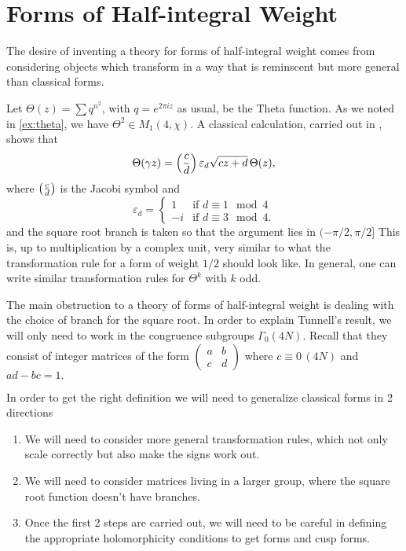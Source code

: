 \documentclass[12pt, a4paper]{report}
\begin{document}
\section{Forms of Half-integral Weight}

The desire of inventing a theory for forms of half-integral weight comes from
considering objects which transform in a way that is reminscent but more general
than classical forms.

\begin{example}
  Let $\Theta(z) = \sum q^{n^2}$, with $q = e^{2 \pi i z}$ as usual, be the
  Theta function.
  As we noted in
  \ref{ex:theta}, we have $\Theta^2 \in M_1(4,\chi)$. A classical calculation,
  carried out in \cite[Chapter III-4, Pages 148-149]{koblitz}, shows that
  \[\Theta(\gamma z) = \left(\frac{c}{d}\right) \varepsilon_d \sqrt{cz+d} \,  \Theta(z),\]
  where $\left(\frac{c}{d}\right)$ is the Jacobi symbol and
  \[\varepsilon_d =
    \begin{cases}
      1 & \text{if } d \equiv 1 \mod{4} \\ 
      -i & \text{if } d \equiv 3 \mod{4}.
    \end{cases}
  \]
  and the square root branch is taken so that the argument lies in $(-\pi/2,
  \pi/2 ]$
  This is, up to multiplication by a complex unit, very similar to what the
  transformation rule for a form of weight $1/2$ should look like.
  In general, one can write similar
  transformation rules for $\Theta^k$ with $k$ odd. 
\end{example}

The main obstruction to a theory of forms of half-integral weight is dealing
with the choice of branch for the square root. In order to explain Tunnell's
result, we will only need to work in the congruence subgroups $\Gamma_0(4N)$.
Recall that they consist of integer matrices of the form $
\left( \begin{smallmatrix}
  a & b \\ c & d
\end{smallmatrix} \right)
$ where $c \equiv 0 \, (4N)$ and $ad - bc = 1.$

In order to get the right definition we will need to generalize classical forms
in 2 directions
\begin{enumerate}
\item We will need to consider more general transformation rules, which not only
  scale correctly but also make the signs work out.
\item We will need to consider matrices living in a larger group, where the
  square root function doesn't have branches.
\item Once the first 2 steps are carried out, we will need to be careful in
  defining the appropriate holomorphicity conditions to get forms and cusp forms.
\end{enumerate}
\end{document}

